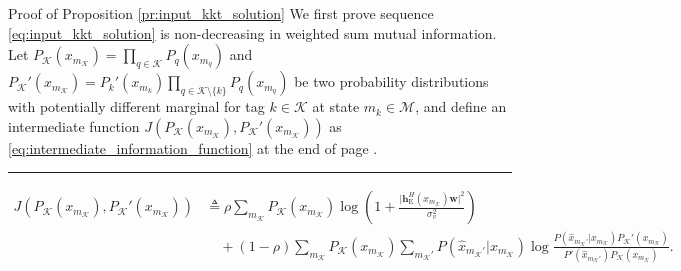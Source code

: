 \documentclass[journal]{IEEEtran}
\begin{document}
\begin{appendix}
	\begin{subsection}{Proof of Proposition \ref{pr:input_kkt_solution}}
		We first prove sequence \eqref{eq:input_kkt_solution} is non-decreasing in weighted sum mutual information.
		Let $P_{\mathcal{K}}(x_{m_{\mathcal{K}}}) = \prod_{q \in \mathcal{K}} P_q(x_{m_q})$ and $P_{\mathcal{K}}'(x_{m_{\mathcal{K}}}) = P_k'(x_{m_k}) \prod_{q \in \mathcal{K} \setminus \{k\}} P_q(x_{m_q})$ be two probability distributions with potentially different marginal for tag $k \in \mathcal{K}$ at state $m_k \in \mathcal{M}$, and define an intermediate function $J \left( P_{\mathcal{K}}(x_{m_{\mathcal{K}}}),P_{\mathcal{K}}'(x_{m_{\mathcal{K}}}) \right)$ as \eqref{eq:intermediate_information_function} at the end of page \pageref{eq:intermediate_information_function}.
		\begin{figure*}[!b]
			\hrule
			\begin{align}
				J \left( P_{\mathcal{K}}(x_{m_{\mathcal{K}}}),P_{\mathcal{K}}'(x_{m_{\mathcal{K}}}) \right)
				 & \triangleq \rho \sum_{m_{\mathcal{K}}} P_{\mathcal{K}}(x_{m_{\mathcal{K}}}) \log \left(1 + \frac{\lvert \boldsymbol{h}_{\mathrm{E}}^H(x_{m_{\mathcal{K}}}) \boldsymbol{w} \rvert^2}{\sigma_v^2}\right)\nonumber                                                                                                                    \\
				 & \quad + (1 - \rho) \sum_{m_{\mathcal{K}}} P_{\mathcal{K}}(x_{m_{\mathcal{K}}}) \sum_{m_{\mathcal{K}}'} P(\hat{x}_{m_{\mathcal{K}}'}|x_{m_{\mathcal{K}}}) \log \frac{P(\hat{x}_{m_{\mathcal{K}}'}|x_{m_{\mathcal{K}}}) P_{\mathcal{K}}'(x_{m_{\mathcal{K}}})}{P'(\hat{x}_{m_{\mathcal{K}}'}) P_{\mathcal{K}}(x_{m_{\mathcal{K}}})}.
				\label{eq:intermediate_information_function}
			\end{align}

\end{figure*}
\end{subsection}
\end{appendix}
\end{document}
